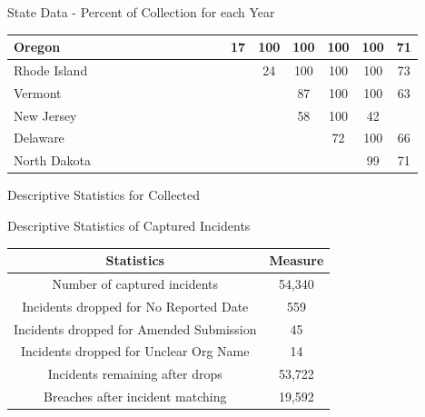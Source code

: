 \documentclass[10pt]{beamer}
\begin{document}
\begin{frame}{State Data - Percent of Collection for each Year}
\begin{table}[!h]
{\begin{tabular}{|l|c|c|c|c|c|c|c|c|c|c|c|c|c|c|c|c|}
    \hline
  Oregon &  & & & & & & & & &  & 17 & 100 & 100 & 100 & 100 & 71 \\
    \hline
  Rhode Island &  & & & & & & & & & & & 24 & 100 & 100 & 100 & 73 \\
    \hline
  Vermont &  & & & & & & & & & & & & 87 & 100 & 100 & 63 \\
    \hline   
  New Jersey &  & & & & & & & & & & & & 58 & 100 & 42 & \\
    \hline   
    Delaware &  & & & & & & & & & & & &  & 72 & 100 & 66 \\
    \hline   
  North Dakota &  & & & & & & & & & & & & & &  99 & 71 \\
    \hline
\end{tabular}}
\end{table}
\end{frame}


\begin{frame}{Descriptive Statistics for Collected }
\begin{table}[!h]
Descriptive Statistics of Captured Incidents
    \tabcolsep 2pt
    \label{tab:datasets1}
\begin{tabular}{|c|c|}
  \hline
  \textbf{Statistics} & \textbf{Measure}  \\
  \hline
  Number of captured incidents & 54,340 \\
  \hline
  Incidents dropped for No Reported Date & 559 \\
  Incidents dropped for Amended Submission & 45 \\
  Incidents dropped for Unclear Org Name & 14 \\
  \hline
  Incidents remaining after drops & 53,722 \\
  \hline
  Breaches after incident matching & 19,592 \\
  \hline
\end{tabular}
\end{table}

\end{frame}
\end{document}
